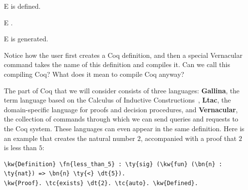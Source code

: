 \begin{SaveVerbatim}{E}
\listsum{} is defined.
\end{SaveVerbatim}

\vspace{.1in}

\begin{SaveVerbatim}{E}
 \listsum{}.
\end{SaveVerbatim}

\begin{SaveVerbatim}{E}
 is generated.
\end{SaveVerbatim}




  

Notice how the user first creates a Coq definition, and then a special \gls{Vernacular} command takes the name of this definition and compiles it. Can we call this compiling Coq? What does it mean to compile Coq anyway?

The part of Coq that we will consider consists of three languages: \textbf{\gls{Gallina}}, the term language based on the Calculus of Inductive Constructions~\cite{coquand1988inductively}, \textbf{\gls{Ltac}}, the domain-specific language for proofs and decision procedures, and \textbf{\gls{Vernacular}}, the collection of commands through which we can send queries and requests to the Coq system. These languages can even appear in the same definition. Here is an example that creates the natural number $2$, accompanied with a proof that $2$ is less than $5$:

\begin{Verbatim}
\kw{Definition} \fn{less_than_5} : \ty{sig} (\kw{fun} (\bn{n} : \ty{nat}) => \bn{n} \ty{<} \dt{5}).
\kw{Proof}. \tc{exists} \dt{2}. \tc{auto}. \kw{Defined}.
\end{Verbatim}

